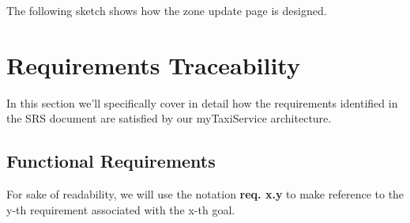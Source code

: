 \pagebreak
The following sketch shows how the zone update page is designed. 
\begin{figure}[H]
\centering
{}
\end{figure}

\chapter{Requirements Traceability}
In this section we'll specifically cover in detail how the requirements identified in the SRS document are satisfied by our myTaxiService architecture. 

\section{Functional Requirements}

For sake of readability, we will use the notation \textbf{req. x.y} to make reference to the y-th requirement associated with the x-th goal.

